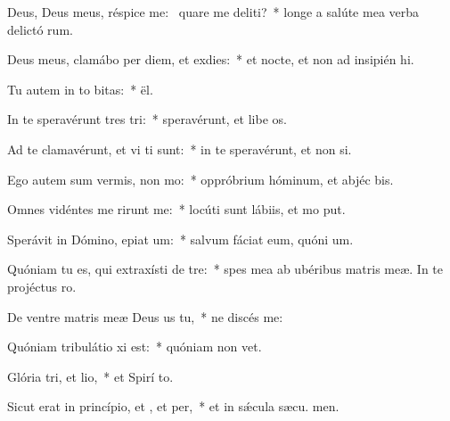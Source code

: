 \item Deus, Deus meus, réspice  me:~\pscross{} quare me deliti?~* longe a salúte mea verba delictó rum.
\item Deus meus, clamábo per diem, et  exdies:~* et nocte, et non ad insipién hi.
\item Tu autem in to bitas:~*  ël.
\item In te speravérunt tres tri:~* speravérunt, et libe os.
\item Ad te clamavérunt, et vi ti sunt:~* in te speravérunt, et non  si.
\item Ego autem sum vermis,  non mo:~* oppróbrium hóminum, et abjéc bis.
\item Omnes vidéntes me rirunt me:~* locúti sunt lábiis, et mo put.
\item Sperávit in Dómino, epiat um:~* salvum fáciat eum, quóni  um.
\item Quóniam tu es, qui extraxísti  de tre:~* spes mea ab ubéribus matris meæ. In te projéctus   ro.
\item De ventre matris meæ Deus us  tu,~* ne discés  me:
\item Quóniam tribulátio xi est:~* quóniam non   vet.
\item Glória tri, et lio,~* et Spirí to.
\item Sicut erat in princípio, et , et per,~* et in sǽcula sæcu. men.
